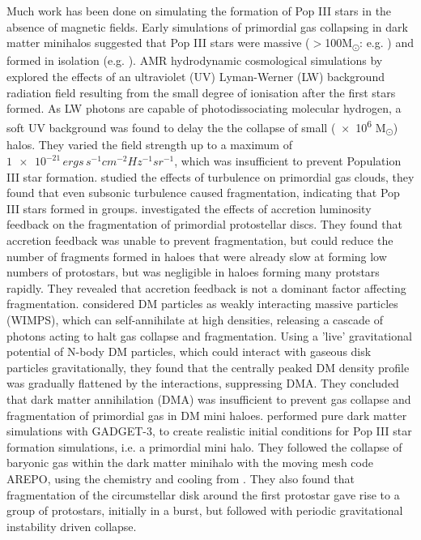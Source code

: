 \documentclass[11pt]{article}
\begin{document}
Much work has been done on simulating the formation of Pop III stars in the absence of magnetic fields. Early simulations of primordial gas collapsing in dark matter minihalos suggested that Pop III stars were massive ($>$100M\textsubscript{\(\odot\)}: e.g. \citealt{Bromm1999}) and formed in isolation (e.g. \citealt{Haiman1996}).
AMR hydrodynamic cosmological simulations by \cite{OShea2008} explored the effects of an ultraviolet (UV) Lyman-Werner (LW) background radiation field resulting from the small degree of ionisation after the first stars formed. As LW photons are capable of photodissociating molecular hydrogen, a soft UV background was found to delay the the collapse of small (\num{e6} M\textsubscript{\(\odot\)}) halos. They varied the field strength up to a maximum of $\num{1e-21} \, ergs \, s^{-1} cm^{-2} Hz^{-1} sr^{-1}$, which was insufficient to prevent Population III star formation.
\citep{Clark2011}  studied the effects of turbulence on primordial gas clouds, they found that even subsonic turbulence caused fragmentation, indicating that Pop III stars formed in groups. \cite{Smith2011}  investigated the effects of accretion luminosity feedback on the fragmentation of primordial protostellar discs. They found that accretion feedback was unable to prevent fragmentation, but could reduce the number of fragments formed in haloes that were already slow at forming low numbers of protostars, but was negligible in haloes forming many protstars rapidly. They revealed that accretion feedback is not a dominant factor affecting fragmentation.
\cite{Stacy2014} considered DM particles as weakly interacting massive particles (WIMPS), which can self-annihilate at high densities, releasing a cascade of photons acting to halt gas collapse and fragmentation. Using a 'live' gravitational potential of N-body DM particles, which could interact with gaseous disk particles gravitationally, they found that the centrally peaked DM density profile was gradually flattened by the interactions, suppressing DMA. They concluded that dark matter annihilation (DMA) was insufficient to prevent gas collapse and fragmentation of primordial gas in DM mini haloes.
\cite{Greif2018} performed pure dark matter simulations with GADGET-3, to create realistic initial conditions for Pop III star formation simulations, i.e. a primordial mini halo. They followed the collapse of baryonic gas within the dark matter minihalo with the moving mesh code AREPO, using the chemistry and cooling from \cite{Clark2011} . They also found that fragmentation of the circumstellar disk around the first protostar gave rise to a group of protostars, initially in a burst, but followed with periodic gravitational instability driven collapse.
\end{document}
